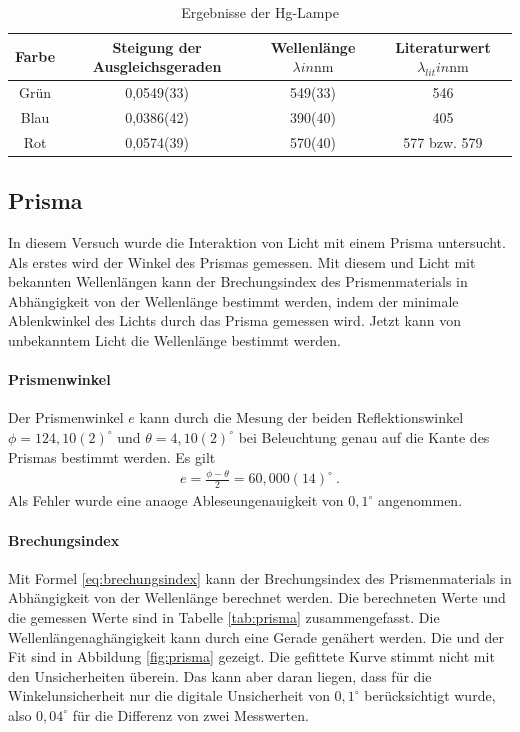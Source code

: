 \documentclass[11pt, a4paper]{article}
\begin{document}
    \begin{table}
        \centering
        \begin{tabular}{c|c|c|c}
            
            Farbe & Steigung der Ausgleichsgeraden & Wellenlänge $\lambda in \si{\nano\metre}$  & Literaturwert  $\lambda_{lit} in \si{\nano\metre}$\\ \hline
            Grün & 0,0549(33) & 549(33) & 546 \\ \hline
            Blau &  0,0386(42) & 390(40) & 405 \\ \hline
            Rot & 0,0574(39) & 570(40) &577 bzw. 579  \\\hline

        \end{tabular}
        \caption{Ergebnisse der Hg-Lampe}
        \label{tab:Gitter}
    \end{table}

    \subsection{Prisma}
    In diesem Versuch wurde die Interaktion von Licht mit einem Prisma untersucht. Als erstes wird der Winkel des Prismas gemessen. Mit diesem und Licht mit bekannten Wellenlängen kann der Brechungsindex des Prismenmaterials in Abhängigkeit von der Wellenlänge bestimmt werden, indem der minimale Ablenkwinkel des Lichts durch das Prisma gemessen wird. Jetzt kann von unbekanntem Licht die Wellenlänge bestimmt werden.
    \paragraph{Prismenwinkel}
    Der Prismenwinkel $e$ kann durch die Mesung der beiden Reflektionswinkel $\phi = 124,10(2)^{\circ}$ und $\theta = 4,10(2)^{\circ}$ bei Beleuchtung genau auf die Kante des Prismas bestimmt werden. Es gilt
    \begin{align}
        e = \frac{\phi - \theta}{2} = 60,000(14)^{\circ} \label{eq:prisma} \ .
    \end{align}
    Als Fehler wurde eine anaoge Ableseungenauigkeit von $0,1^{\circ}$ angenommen.

    \paragraph{Brechungsindex}
    Mit Formel \ref{eq:brechungsindex} kann der Brechungsindex des Prismenmaterials in Abhängigkeit von der Wellenlänge berechnet werden. Die berechneten Werte und die gemessen Werte sind in Tabelle \ref{tab:prisma} zusammengefasst. Die Wellenlängenaghängigkeit kann durch eine Gerade genähert werden. Die und der Fit sind in Abbildung \ref{fig:prisma} gezeigt. Die gefittete Kurve stimmt nicht mit den Unsicherheiten überein. Das kann aber daran liegen, dass für die Winkelunsicherheit nur die digitale Unsicherheit von $0,1^{\circ}$ berücksichtigt wurde, also $0,04^{\circ}$ für die Differenz von zwei Messwerten.
\end{document}
